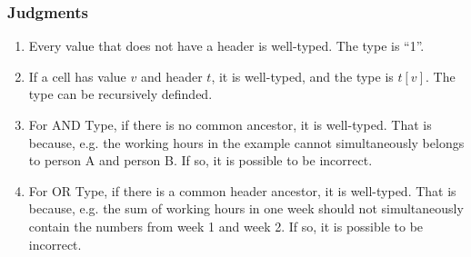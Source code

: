 \documentclass[a4paper]{article}
\begin{document}
\subsubsection{Judgments}
\begin{enumerate}
\item Every value that does not have a header is well-typed. The type is ``1''.
\item If a cell has value $v$ and header $t$, it is well-typed, and the type is $t[v]$. The type can be recursively definded.
\item For AND Type, if there is no common ancestor, it is well-typed. That is because, e.g. the working hours in the example cannot simultaneously belongs to person A and person B. If so, it is possible to be incorrect.
\item For OR Type, if there is a common header ancestor, it is well-typed. That is because, e.g. the sum of working hours in one week should not simultaneously contain the numbers from week 1 and week 2. If so, it is possible to be incorrect.
\end{enumerate}
\end{document}
